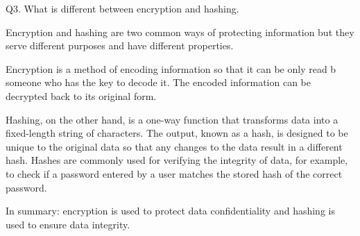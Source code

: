 
Q3. What is different between encryption and hashing.

    Encryption and hashing are two common ways of protecting information but they 
serve different purposes and have different properties.

    Encryption is a method of encoding information so that it can be only read b 
someone who has the key to decode it. The encoded information can be decrypted 
back to its original form.

    Hashing, on the other hand, is a one-way function that transforms data into a
fixed-length string of characters. The output, known as a hash, is designed 
to be unique to the original data so that any changes to the data result in
a different hash. Hashes are commonly used for verifying the integrity of 
data, for example, to check if a password entered by a user matches the stored
hash of the correct password.

    In summary: encryption is used to protect data confidentiality and hashing is 
used to ensure data integrity.